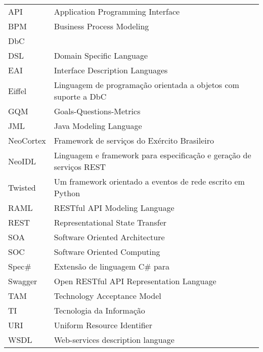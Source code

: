 {}

\newcommand{\acrlista}[1]{\vspace{12pt}\noindent #1\\}
\newcommand\tab[1][1cm]{\hspace*{#1}}


\begin{table}[!bth] 
\begin{tabular}{p{2cm}p{13cm}}
API & Application Programming Interface\\
BPM & Business Process Modeling\\
DbC & \designbycontract{}\\
DSL & Domain Specific Language\\
EAI & Interface Description Languages \\
Eiffel & Linguagem de programação orientada a objetos com suporte a
DbC\\
GQM & Goals-Questions-Metrics\\
JML & Java Modeling Language\\
NeoCortex & Framework de serviços do Exército Brasileiro\\
NeoIDL & Linguagem e framework para especificação e geração de serviços REST\\
Twisted & Um framework orientado a eventos de rede escrito em Python\\
RAML & RESTful API Modeling Language\\
REST & Representational State Transfer\\
SOA & Software Oriented Architecture\\
SOC & Software Oriented Computing\\
Spec\# & Extensão de linguagem C\# para \designbycontract{}\\
Swagger & Open RESTful API Representation Language\\
TAM & Technology Acceptance Model\\
TI & Tecnologia da Informação\\
URI & Uniform Resource Identifier\\
WSDL & Web-services description language\\

\end{tabular}
\end{table}

\pagebreak
